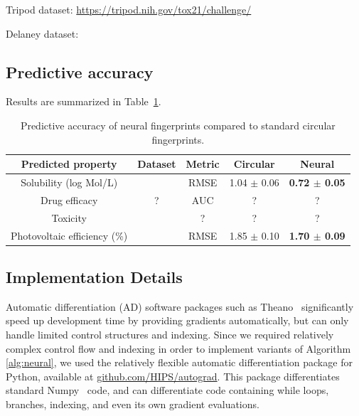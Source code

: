 \documentclass{article}
\begin{document}
Tripod dataset: \url{https://tripod.nih.gov/tox21/challenge/}
\cite{unterthiner2015toxicity}

Delaney dataset:
\cite{delaney_data_2004}


\subsection{Predictive accuracy}

Results are summarized in Table~\ref{table:main results}.


\begin{table}
\begin{tabular}{ccc|cc}
Predicted property           & Dataset                     & Metric & Circular        & Neural   \\
\hline
Solubility (log Mol/L)       & \citet{delaney_data_2004}   &   RMSE & 1.04 $\pm$ 0.06 & \bf{0.72} $\pm$ 0.05 \\
Drug efficacy                & ?                           &   AUC  & ?               &      ?               \\
Toxicity                     & \citet{tox21}               &    ?   & ?               &      ?               \\
Photovoltaic efficiency (\%) & \citet{hachmann2011harvard} &  RMSE  & 1.85 $\pm$ 0.10 & \bf{1.70} $\pm$ 0.09
\end{tabular}
\label{table:main results}
\caption{Predictive accuracy of neural fingerprints compared to standard circular fingerprints.}
\end{table}


\subsection{Implementation Details}
Automatic differentiation (AD) software packages such as
Theano~\citep{Bastien-Theano-2012, bergstra2010scipy} significantly speed up development time by providing gradients automatically, but can only handle limited control structures and indexing.
Since we required relatively complex control flow and indexing in order to implement variants of Algorithm \ref{alg:neural}, we used the relatively flexible automatic differentiation package for Python, available at \url{github.com/HIPS/autograd}.
This package differentiates standard Numpy~\citep{oliphant2007python} code, and can differentiate code containing while loops, branches, indexing, and even its own gradient evaluations.
\end{document}
